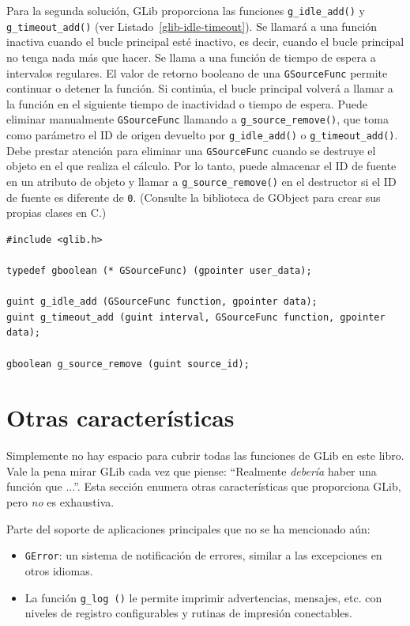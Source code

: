 Para la segunda solución, GLib proporciona las funciones \lstinline{g_idle_add()} y \lstinline{g_timeout_add()} (ver Listado~\ref{glib-idle-timeout}). Se llamará a una función inactiva cuando el bucle principal esté inactivo, es decir, cuando el bucle principal no tenga nada más que hacer. Se llama a una función de tiempo de espera a intervalos regulares. El valor de retorno booleano de una \lstinline{GSourceFunc} permite continuar o detener la función. Si continúa, el bucle principal volverá a llamar a la función en el siguiente tiempo de inactividad o tiempo de espera. Puede eliminar manualmente \lstinline{GSourceFunc} llamando a \lstinline{g_source_remove()}, que toma como parámetro el ID de origen devuelto por \lstinline{g_idle_add()} o \lstinline{g_timeout_add()}. Debe prestar atención para eliminar una \lstinline{GSourceFunc} cuando se destruye el objeto en el que realiza el cálculo. Por lo tanto, puede almacenar el ID de fuente en un atributo de objeto y llamar a \lstinline{g_source_remove()} en el destructor si el ID de fuente es diferente de \lstinline{0}. (Consulte la biblioteca de GObject para crear sus propias clases en C.)

\begin{lstlisting}[float, caption={Idles and timeouts}, label=glib-idle-timeout]
#include <glib.h>

typedef gboolean (* GSourceFunc) (gpointer user_data);

guint g_idle_add (GSourceFunc function, gpointer data);
guint g_timeout_add (guint interval, GSourceFunc function, gpointer data);

gboolean g_source_remove (guint source_id);
\end{lstlisting}

\section{Otras características}

Simplemente no hay espacio para cubrir todas las funciones de GLib en este libro. Vale la pena mirar GLib cada vez que piense: ``Realmente \emph{debería} haber una función que ...''. Esta sección enumera otras características que proporciona GLib, pero \emph{no} es exhaustiva.

Parte del soporte de aplicaciones principales que no se ha mencionado aún:
\begin{itemize}
    \item \lstinline{GError}: un sistema de notificación de errores, similar a las excepciones en otros idiomas.
    \item La función \lstinline{g_log ()} le permite imprimir advertencias, mensajes, etc. con niveles de registro configurables y rutinas de impresión conectables.
\end{itemize}

